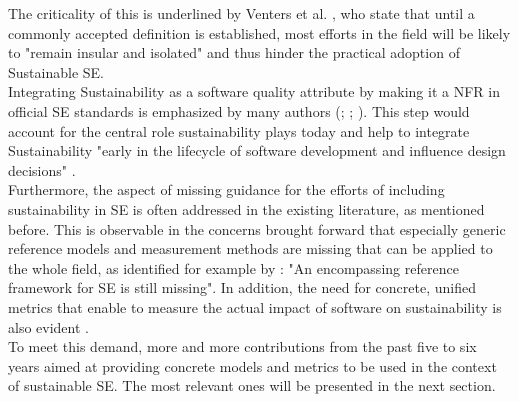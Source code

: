 \documentclass[oribibl]{llncs}
\begin{document}
The criticality of this %
is underlined by Venters et al. \cite{venters_software_2014}, who state that until a commonly accepted definition is established, most efforts in the field will be likely to "remain insular and isolated" \cite[p.\,5]{venters_software_2014} and thus hinder the practical adoption of Sustainable SE.\\
Integrating Sustainability as a software quality attribute by making it a NFR in official SE standards is emphasized by many authors (\cite{penzenstadler_safety_2014}; \cite{amsel_toward_2011}; \cite{agarwal_sustainable_2012}). This step would account for the central role sustainability plays today \cite{penzenstadler_safety_2014} and help to integrate Sustainability "early in the lifecycle of software development and influence design decisions" \cite[p.\,2]{raturi_developing_2014}.\\ %
Furthermore, the aspect of missing guidance for the efforts of including sustainability in SE is often addressed in the existing literature, as mentioned before. %
This is observable in the concerns brought forward that especially generic reference models and measurement methods are missing that can be applied to the whole field, as identified for example by \cite{penzenstadler_sustainability_2012}: "An encompassing reference framework for SE is still missing". %
In addition, the need for concrete, unified metrics that enable to measure the actual impact of software on sustainability is also evident %
.\\
To meet %
this demand, more and more contributions from the past five to six years aimed at providing concrete models and metrics to be used in the context of sustainable SE. The most relevant ones will be presented in the next section.
\end{document}

